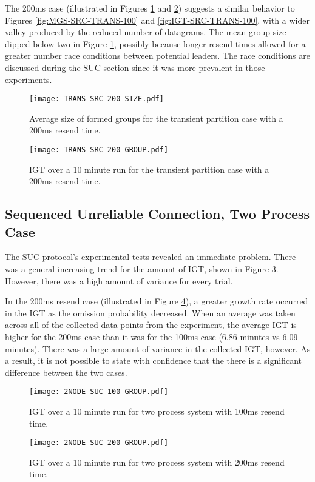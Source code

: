The 200ms case (illustrated in Figures \ref{fig:MGS-SRC-TRANS-200} and \ref{fig:IGT-SRC-TRANS-200}) suggests a similar behavior to Figures \ref{fig:MGS-SRC-TRANS-100} and \ref{fig:IGT-SRC-TRANS-100}, with a wider valley produced by the reduced number of datagrams.
The mean group size dipped below two in Figure \ref{fig:MGS-SRC-TRANS-200}, possibly because longer resend times allowed for a greater number race conditions between potential leaders.
The race conditions are discussed during the SUC section since it was more prevalent in those experiments.

\begin{figure}[htbp]
\centering
    \centering
    \texttt{[image: TRANS-SRC-200-SIZE.pdf]}
    \caption{Average size of formed groups for the transient partition case with a 200ms resend time.}
    \label{fig:MGS-SRC-TRANS-200}
\end{figure}
\begin{figure}[htbp]
    \centering
    \texttt{[image: TRANS-SRC-200-GROUP.pdf]}
    \caption{\ac{IGT} over a 10 minute run for the transient partition case with a 200ms resend time.}
    \label{fig:IGT-SRC-TRANS-200}
\end{figure}

\subsection{Sequenced Unreliable Connection, Two Process Case}

The SUC protocol's experimental tests revealed an immediate problem.
There was a general increasing trend for the amount of \ac{IGT}, shown in Figure \ref{fig:IGT-SUC-2NODE-100}.
However, there was a high amount of variance for every trial.

In the 200ms resend case (illustrated in Figure \ref{fig:IGT-SUC-2NODE-200}), a greater growth rate occurred in the \ac{IGT} as the omission probability decreased.
When an average was taken across all of the collected data points from the experiment, the average \ac{IGT} is higher for the 200ms case than it was for the 100ms case (6.86 minutes vs 6.09 minutes).
There was a large amount of variance in the collected \ac{IGT}, however.
As a result, it is not possible to state with confidence that the there is a significant difference between the two cases.

\begin{figure}[htbp]
    \centering
    \texttt{[image: 2NODE-SUC-100-GROUP.pdf]}
    \caption{\ac{IGT} over a 10 minute run for two process system with 100ms resend time.}
    \label{fig:IGT-SUC-2NODE-100}
\end{figure}%
\begin{figure}[htbp]
    \centering
    \texttt{[image: 2NODE-SUC-200-GROUP.pdf]}
    \caption{\ac{IGT} over a 10 minute run for two process system with 200ms resend time.}
    \label{fig:IGT-SUC-2NODE-200}
\end{figure}

